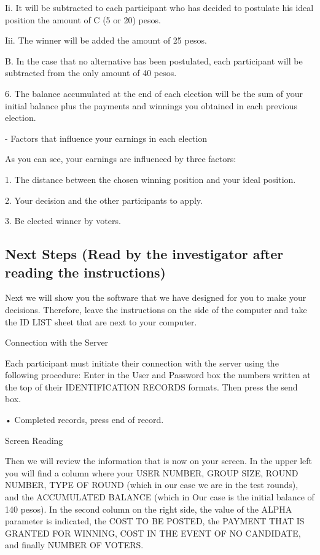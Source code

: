 Ii. It will be subtracted to each participant who has decided to postulate his ideal position the amount of C (5 or 20) pesos.

Iii. The winner will be added the amount of 25 pesos.

B. In the case that no alternative has been postulated, each participant will be subtracted from the only amount of 40 pesos.

6. The balance accumulated at the end of each election will be the sum of your initial balance plus the payments and winnings you obtained in each previous election.

- Factors that influence your earnings in each election

As you can see, your earnings are influenced by three factors:

1. The distance between the chosen winning position and your ideal position.

2. Your decision and the other participants to apply.

3. Be elected winner by voters.

\subsection*{Next Steps (Read by the investigator after reading the instructions)}

Next we will show you the software that we have designed for you to make your decisions. Therefore, leave the instructions on the side of the computer and take the ID LIST sheet that are next to your computer.

Connection with the Server

Each participant must initiate their connection with the server using the following procedure: Enter in the User and Password box the numbers written at the top of their IDENTIFICATION RECORDS formats. Then press the send box.

• Completed records, press end of record.

Screen Reading

Then we will review the information that is now on your screen. In the upper left you will find a column where your USER NUMBER, GROUP SIZE, ROUND NUMBER, TYPE OF ROUND (which in our case we are in the test rounds), and the ACCUMULATED BALANCE (which in Our case is the initial balance of 140 pesos). In the second column on the right side, the value of the ALPHA parameter is indicated, the COST TO BE POSTED, the PAYMENT THAT IS GRANTED FOR WINNING, COST IN THE EVENT OF NO CANDIDATE, and finally NUMBER OF VOTERS.



